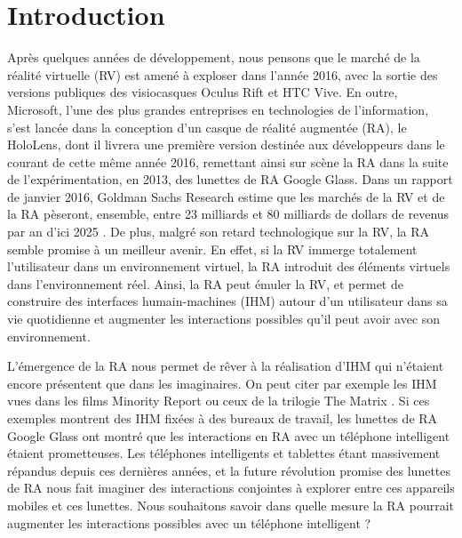 ﻿\section*{Introduction}
Après quelques années de développement, nous pensons que le marché de la réalité virtuelle (RV) est amené à exploser dans l'année 2016, avec la sortie des versions publiques des visiocasques Oculus Rift et HTC Vive. En outre, Microsoft, l'une des plus grandes entreprises en technologies de l'information, s'est lancée dans la conception d'un casque de réalité augmentée (RA), le HoloLens, dont il livrera une première version destinée aux développeurs dans le courant de cette même année 2016, remettant ainsi sur scène la RA dans la suite de l'expérimentation, en 2013, des lunettes de RA Google Glass. Dans un rapport de janvier 2016, Goldman Sachs Research estime que les marchés de la RV et de la RA pèseront, ensemble, entre 23 milliards et 80 milliards de dollars de revenus par an d'ici 2025 \citep{BelliniChenSugiyamaEtAl2016}. De plus, malgré son retard technologique sur la RV, la RA semble promise à un meilleur avenir. \citep{BelliniChenSugiyamaEtAl2016} En effet, si la RV immerge totalement l'utilisateur dans un environnement virtuel, la RA introduit des éléments virtuels dans l'environnement réel. Ainsi, la RA peut émuler la RV, et permet de construire des interfaces humain-machines (IHM) autour d'un utilisateur dans sa vie quotidienne et augmenter les interactions possibles qu'il peut avoir avec son environnement.

L'émergence de la RA nous permet de rêver à la réalisation d'IHM qui n'étaient encore présentent que dans les imaginaires. On peut citer par exemple les IHM vues dans les films Minority Report  ou ceux de la trilogie The Matrix . Si ces exemples montrent des IHM fixées à des bureaux de travail, les lunettes de RA Google Glass ont montré que les interactions en RA avec un téléphone intelligent étaient prometteuses. Les téléphones intelligents et tablettes étant massivement répandus depuis ces dernières années, et la future révolution promise des lunettes de RA nous fait imaginer des interactions conjointes à explorer entre ces appareils mobiles et ces lunettes. Nous souhaitons savoir dans quelle mesure la RA pourrait augmenter les interactions possibles avec un téléphone intelligent ?


